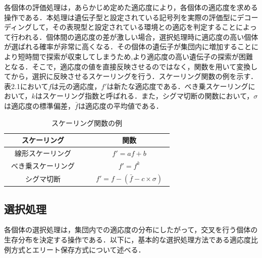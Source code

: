 各個体の評価処理は，あらかじめ定めた適応度により，各個体の適応度を求める操作である．本処理は遺伝子型と設定されている記号列を実際の評価型にデコーディングして，その表現型と設定されている環境との適応を判定することによって行われる．個体間の適応度の差が激しい場合，選択処理時に適応度の高い個体が選ばれる確率が非常に高くなる．その個体の遺伝子が集団内に増加することにより短時間で探索が収束してしまうため,より適応度の高い遺伝子の探索が困難となる．そこで，適応度の値を直接反映させるのではなく，関数を用いて変換してから，選択に反映させるスケーリングを行う．スケーリング関数の例を示す．表2.1において$f$は元の適応度，$f'$は新たな適応度である．べき乗スケーリングにおいて，$k$はスケーリング指数と呼ばれる．また，シグマ切断の関数において，$\sigma$は適応度の標準偏差，$\bar{f}$は適応度の平均値である．



\begin{table}[!ht]
\caption{スケーリング関数の例}
\label{tb:sk}
\begin{center}
\begin{tabular}{|c||c|}\hline
スケーリング　&　関数　\\ \hline
線形スケーリング　&　$f'=af+b$　\\ \hline
べき乗スケーリング　&　$f'=f^{k}$　\\ \hline
シグマ切断　&　$f'=f-( \bar{f} - c \times \sigma )$　\\ \hline
\end{tabular}
\end{center}
\end{table}

\newpage


\subsection{選択処理}
\label{sec2.1.3}

各個体の選択処理は，集団内での適応度の分布にしたがって，交叉を行う個体の生存分布を決定する操作である．以下に，基本的な選択処理方法である適応度比例方式とエリート保存方式について述べる．

